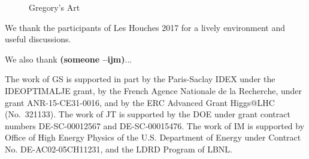 \documentclass[11pt,letterpaper]{article}
\newcommand{\ijm}[1]{\textbf{\textcolor{llblue}{(#1 --ijm)}}}
\begin{document}
\begin{figure}
\begin{center}
\qquad
{}
\end{center}
\caption{Gregory's Art
}
\label{fig:phasespace}
\end{figure}


\begin{acknowledgments}

We thank the participants of Les Houches 2017 for a lively environment and useful discussions.

We also thank \ijm{someone}...

The work of GS is supported in part by the Paris-Saclay IDEX under the
IDEOPTIMALJE grant, by the French Agence Nationale de la Recherche,
under grant ANR-15-CE31-0016, and by the ERC Advanced Grant Higgs@LHC
(No.\ 321133).
%
The work of JT is supported by the DOE under grant contract numbers DE-SC-00012567 and DE-SC-00015476.
%
The work of IM is supported by Office of High Energy Physics of the U.S. Department of Energy under Contract No. DE-AC02-05CH11231, and the LDRD Program of LBNL.


\end{acknowledgments}
\end{document}
